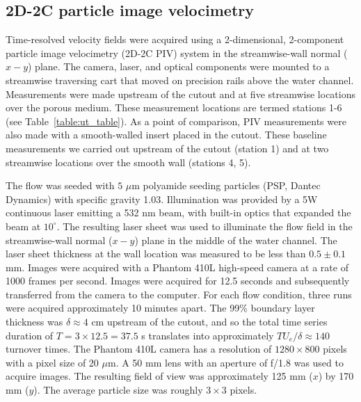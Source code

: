 \documentclass[letterpaper,11pt]{article}
\begin{document}
\subsection{2D-2C particle image velocimetry}\label{sec:piv}
Time-resolved velocity fields were acquired using a 2-dimensional, 2-component particle image velocimetry (2D-2C PIV) system in the streamwise-wall normal ($x-y$) plane. The camera, laser, and optical components were mounted to a streamwise traversing cart that moved on precision rails above the water channel.  Measurements were made upstream of the cutout and at five streamwise locations over the porous medium. These measurement locations are termed stations 1-6 (see Table~\ref{table:ut_table}). As a point of comparison, PIV measurements were also made with a smooth-walled insert placed in the cutout.  These baseline measurements we carried out upstream of the cutout (station 1) and at two streamwise locations over the smooth wall (stations 4, 5).  

The flow was seeded with $5$ $\mu$m polyamide seeding particles (PSP, Dantec Dynamics) with specific gravity 1.03.  Illumination was provided by a 5W continuous laser emitting a 532 nm beam, with built-in optics that expanded the beam at $10^\circ$.  The resulting laser sheet was used to illuminate the flow field in the streamwise-wall normal ($x-y$) plane in the middle of the water channel. The laser sheet thickness at the wall location was measured to be less than $0.5\pm0.1$ mm. Images were acquired with a Phantom 410L high-speed camera at a rate of 1000 frames per second.  Images were acquired for 12.5 seconds and subsequently transferred from the camera to the computer. For each flow condition, three runs were acquired approximately 10 minutes apart.  The 99\% boundary layer thickness was $\delta \approx 4$ cm upstream of the cutout, and so the total time series duration of $T = 3\times 12.5 = 37.5$ s translates into approximately $T U_e/\delta \approx 140$ turnover times.  The Phantom 410L camera has a resolution of $1280 \times 800$ pixels with a pixel size of 20 $\mu$m. A 50 mm lens with an aperture of f/1.8 was used to acquire images.  The resulting field of view was approximately 125 mm ($x$) by 170 mm ($y$). The average particle size was roughly $3 \times 3$ pixels. 
\end{document}
